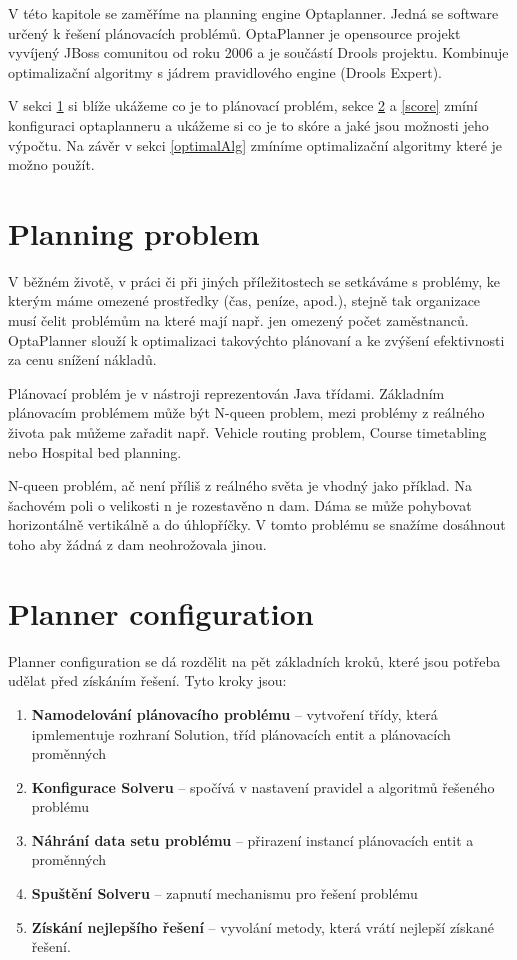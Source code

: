 V této kapitole se zaměříme na planning engine Optaplanner. Jedná se software určený k řešení plánovacích problémů. OptaPlanner je opensource projekt vyvíjený JBoss comunitou od roku 2006 a je součástí Drools projektu. Kombinuje optimalizační algoritmy s jádrem pravidlového engine (Drools Expert). 

V sekci \ref{planningProblem} si blíže ukážeme co je to plánovací problém, sekce \ref{plannerConf} a \ref{score} zmíní konfiguraci optaplanneru a ukážeme si co je to skóre a jaké jsou možnosti jeho výpočtu. Na závěr v sekci \ref{optimalAlg} zmíníme optimalizační algoritmy které je možno použít.

\section{Planning problem}\label{planningProblem}
V běžném životě, v práci či při jiných příležitostech se setkáváme s problémy, ke kterým máme omezené prostředky (čas, peníze, apod.), stejně tak organizace musí čelit problémům na které mají např. jen omezený počet zaměstnanců. OptaPlanner slouží k optimalizaci takovýchto plánovaní a ke zvýšení efektivnosti za cenu snížení nákladů.

Plánovací problém je v nástroji reprezentován Java třídami. Základním plánovacím problémem může být N-queen problem, mezi problémy z reálného života pak můžeme zařadit např. Vehicle routing problem,  Course timetabling nebo Hospital bed planning.

N-queen problém, ač není příliš z reálného světa je vhodný jako příklad. Na šachovém poli o velikosti n je rozestavěno n dam. Dáma se může pohybovat horizontálně vertikálně a do úhlopříčky. V tomto problému se snažíme dosáhnout toho aby žádná z dam neohrožovala jinou. 

\section{Planner configuration}\label{plannerConf}
Planner configuration se dá rozdělit na pět základních kroků, které jsou potřeba udělat před získáním řešení. Tyto kroky jsou:
\begin{enumerate}
\item \textbf{Namodelování plánovacího problému} -- vytvoření třídy, která ipmlementuje rozhraní Solution, tříd plánovacích entit a plánovacích proměnných
\item \textbf{Konfigurace Solveru} -- spočívá v nastavení pravidel a algoritmů řešeného problému
\item \textbf{Náhrání data setu problému} -- přirazení instancí plánovacích entit a proměnných
\item \textbf{Spuštění Solveru} -- zapnutí mechanismu pro řešení problému
\item \textbf{Získání nejlepšího řešení} -- vyvolání metody, která vrátí nejlepší získané řešení.
\end{enumerate}

